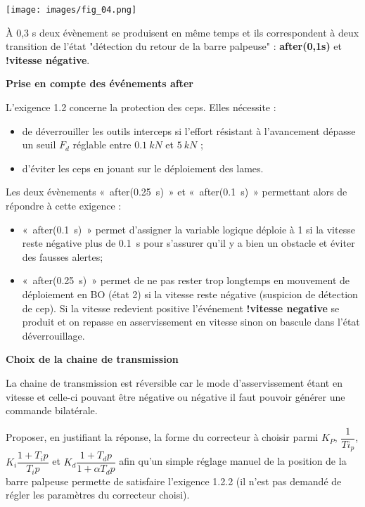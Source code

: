 \documentclass[11pt]{article}
\begin{document}
\begin{UPSTIcorrige}
\begin{center}
\texttt{[image: images/fig\_04.png]}
\end{center}

À 0,3 s deux évènement se produisent en même temps et ils correspondent à deux transition de l'état "détection du retour de la barre palpeuse" : \textbf{after(0,1s)} et \textbf{!vitesse négative}.

\textbf{Prise en compte des événements after}

L'exigence 1.2 concerne la protection des ceps. Elles nécessite :
\begin{itemize}
\item de déverrouiller les outils interceps si l'effort résistant à l'avancement dépasse un seuil  $F_d$ réglable entre $\SI{0,1}{kN}$ et $\SI{5}{kN}$ ;
\item d'éviter les ceps en jouant sur le déploiement des lames.
\end{itemize}

Les deux évènements «~after(\SI{0,25}{s})~» et «~after(\SI{0,1}{s})~» permettant alors de répondre à cette exigence : 
\begin{itemize}
\item «~after(\SI{0,1}{s})~» permet d'assigner la variable logique déploie à 1 si la vitesse reste négative plus de \SI{0,1}{s} pour s'assurer qu'il y a bien un obstacle et éviter des fausses alertes;
\item «~after(\SI{0,25}{s})~» permet de ne pas rester trop longtemps en mouvement de déploiement en BO (état 2) si la vitesse reste négative (suspicion de détection de cep). Si la vitesse redevient positive l’événement \textbf{!vitesse negative} se produit et on repasse en asservissement en vitesse sinon on bascule dans l'état déverrouillage.
\end{itemize}

\textbf{Choix de la chaine de transmission}


La chaine de transmission est réversible car le mode d'asservissement étant en vitesse et celle-ci pouvant être négative ou négative il faut pouvoir générer une commande bilatérale.


\end{UPSTIcorrige}





\UPSTIquestion  Proposer, en justifiant la réponse, la forme du correcteur à choisir parmi $K_P$, $\dfrac{1}{Ti_p}$, $K_i \dfrac{1+T_i p}{T_i p}$ et $K_d \dfrac{1+T_d p}{1+\alpha T_d p}$ afin qu’un simple réglage manuel de la position de la barre palpeuse permette de satisfaire l’exigence 1.2.2 (il n’est pas demandé de régler les paramètres du correcteur choisi).
\end{document}
